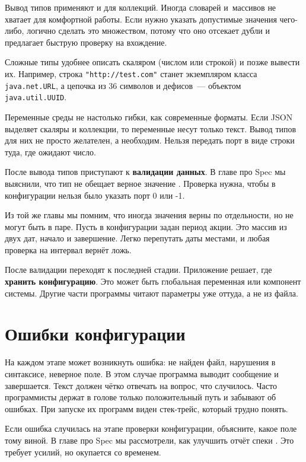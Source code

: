 Вывод типов применяют и для коллекций. Иногда словарей и~массивов не хватает для
комфортной работы. Если нужно указать допустимые значения чего-либо, логично
сделать это множеством, потому что оно отсекает дубли и предлагает быструю
проверку на вхождение.

Сложные типы удобнее описать скаляром (числом или строкой) и позже вывести
их. Например, строка \verb|"http://test.com"| станет экземпляром класса
\verb|java.net.URL|, а цепочка из 36 символов и дефисов~--- объектом
\verb|java.util.UUID|.

Переменные среды не настолько гибки, как современные форматы. Если JSON выделяет
скаляры и коллекции, то переменные несут только текст. Вывод типов для них не
просто желателен, а необходим. Нельзя передать порт в виде строки туда, где
ожидают число.


После вывода типов приступают к \textbf{валидации данных}. В главе про Spec мы
выяснили, что тип не обещает верное значение . Проверка
нужна, чтобы в конфигурации нельзя было указать порт 0 или -1.

Из той же главы мы помним, что иногда значения верны по отдельности, но не могут
быть в паре. Пусть в конфигурации задан период акции. Это массив из двух дат,
начало и завершение. Легко перепутать даты местами, и любая проверка на интервал
вернёт ложь.

После валидации переходят к последней стадии. Приложение решает, где
\textbf{хранить конфигурацию}. Это может быть глобальная переменная или
компонент системы. Другие части программы читают параметры уже оттуда, а не из
файла.

\section{Ошибки конфигурации}


На каждом этапе может возникнуть ошибка: не найден файл, нарушения в синтаксисе,
неверное поле. В этом случае программа выводит сообщение и завершается.  Текст
должен чётко отвечать на вопрос, что случилось. Часто программисты держат в
голове только положительный путь и забывают об ошибках. При запуске их программ
виден стек-трейс, который трудно понять.

Если ошибка случилась на этапе проверки конфигурации, объясните, какое поле тому
виной. В главе про Spec мы рассмотрели, как улучшить отчёт
спеки .  Это требует усилий, но окупается со временем.

